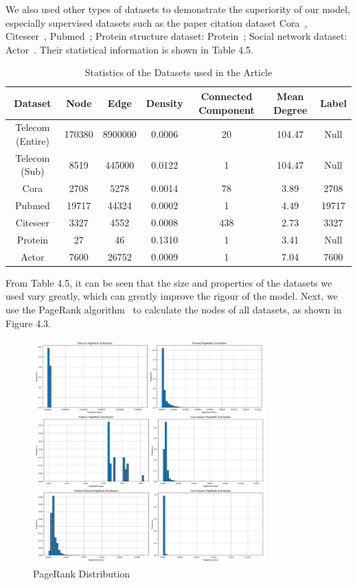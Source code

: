 \documentclass[ %
                    author={Tengyao Tu},
                supervisor={Dr. James Pope},
                    degree={MSc},
                     title={A New Perspective on Graph Community Detection: Combining Traditional Methods with Deep Learning Approaches},
                  subtitle={Applying to Telecom Networks and Diverse Datasets},
                      type={},
                      year={2024}]{dissertation}
\begin{document}
We also used other types of datasets to demonstrate the superiority of our model, especially supervised datasets such as the paper citation dataset Cora~\cite{mccallum2000automating}, Citeseer~\cite{giles1998citeseer}, Pubmed~\cite{canese2013pubmed}; Protein structure dataset: Protein~\cite{jha2022prediction}; Social network dataset: Actor~\cite{caniels2008actor}. Their statistical information is shown in Table 4.5.
\begin{table}[!htbp] 
\centering 
\label{Basic Infomation} 
\caption{Statistics of the Datasets used in the Article} 
\vspace{5pt} 
\begin{tabular}{ccccccc} 
\hline 
Dataset &Node&Edge&Density&Connected Component&Mean Degree&Label \\ 
\hline
Telecom (Entire)&170380&8900000&0.0006&20&104.47&Null \\
Telecom (Sub)&8519&445000&0.0122&1&104.47&Null\\
Cora&2708&5278&0.0014&78&3.89&2708\\
Pubmed&19717&44324& 0.0002&1&4.49&19717\\
Citeseer&3327&4552&0.0008&438&2.73&3327\\
Protein&27&46&0.1310&1&3.41&Null\\
Actor&7600&26752&0.0009&1&7.04&7600\\
\hline
\end{tabular}
\end{table}
From Table 4.5, it can be seen that the size and properties of the datasets we used vary greatly, which can greatly improve the rigour of the model. Next, we use the PageRank algorithm~\cite{page1999pagerank} to calculate the nodes of all datasets, as shown in Figure 4.3.
\begin{figure}[h] %
    \centering
    \includegraphics[width=0.8\textwidth]{Figure_8.png} %
    \caption{PageRank Distribution}
    \label{virtual Graph Data Map}
\end{figure}
\end{document}
